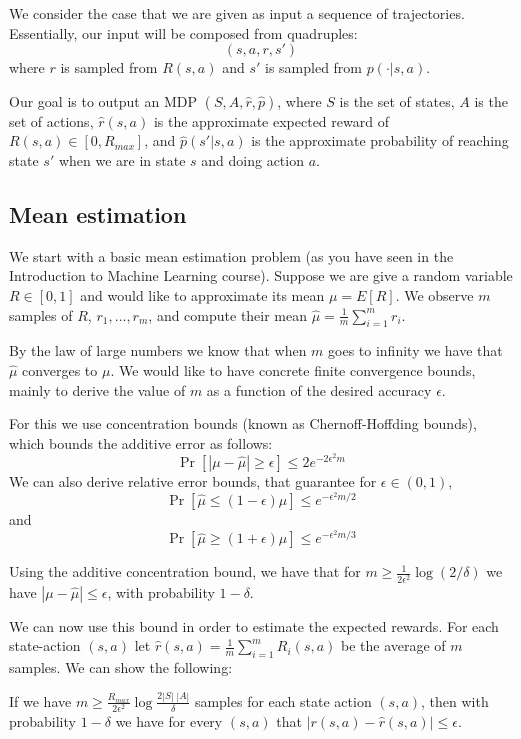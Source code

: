 We consider the case that we are given as input a sequence of
trajectories. Essentially, our input will be composed from
quadruples:
\[
(s,a,r,s')
\]
where $r$ is sampled from $R(s,a)$ and $s'$ is sampled from
$p(\cdot|s,a)$.

Our goal is to output an MDP $(S,A,\widehat{r},\widehat{p})$, where $S$ is
the set of states, $A$ is the set of actions, $\widehat{r}(s,a)$ is the
approximate expected reward of $R(s,a)\in[0,R_{max}]$, and
$\widehat{p}(s'|s,a)$ is the approximate probability of reaching state
$s'$ when we are in state $s$ and doing action $a$.

\subsection{Mean estimation}

We start with a basic mean estimation problem (as you have seen in the
Introduction to Machine Learning course). Suppose we are give a
random variable $R\in[0,1]$ and would like to approximate its mean
$\mu=E[R]$. We observe $m$ samples of $R$, $r_1, \ldots, r_m$, and
compute their mean $\widehat{\mu}=\frac{1}{m}\sum_{i=1}^m r_i$.

By the law of large numbers we know that when $m$ goes to infinity
we have that $\widehat{\mu}$ converges to $\mu$. We would like to have
concrete finite convergence bounds, mainly to derive the value of
$m$ as a function of the desired accuracy $\epsilon$.

For this we use concentration bounds (known as Chernoff-Hoffding
bounds),  which bounds the additive error as follows:
\[
\Pr[|\mu-\widehat{\mu}|\geq \epsilon]\leq 2e^{-2\epsilon^2 m}
\]
We can also derive relative error bounds, that guarantee for
$\epsilon\in(0,1)$,
\[
\Pr[\widehat{\mu}\leq (1-\epsilon)\mu]\leq e^{-\epsilon^2 m /2}
\]
and
\[
\Pr[\widehat{\mu}\geq (1+\epsilon)\mu]\leq e^{-\epsilon^2 m /3}
\]

Using the additive concentration bound, we have that for $m\geq
\frac{1}{2\epsilon^2}\log (2/\delta)$ we have $|\mu-\widehat{\mu}|\leq
\epsilon$, with probability $1-\delta$.

We can now use this bound in order to estimate the expected rewards.
For each state-action $(s,a)$ let
$\widehat{r}(s,a)=\frac{1}{m}\sum_{i=1}^m R_i(s,a)$ be the average of
$m$ samples. We can show the following:

\begin{claim}
If we have $m\geq \frac{R_{max}}{2\epsilon^2}\log \frac{2|S|
\;|A|}{\delta}$ samples for each state action $(s,a)$, then with probability
$1-\delta$ we have for every $(s,a)$ that $|r(s,a)-\widehat{r}(s,a)|\leq
\epsilon$.
\end{claim}

